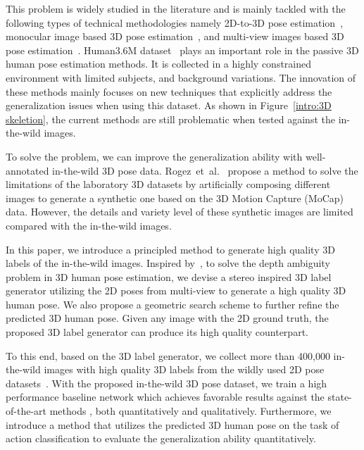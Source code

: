 \documentclass[10pt,twocolumn,letterpaper]{article}
\def\etal{et~al.\xspace}
\begin{document}
This problem is widely studied in the literature and is mainly tackled with the following types of technical methodologies namely 2D-to-3D pose estimation~\cite{fang2017learning, martinez2017simple}, monocular image based 3D pose estimation~\cite{zhou2017towards, yang20183d}, and multi-view images based 3D pose estimation~\cite{rhodin2018learning}. 
Human3.6M dataset~\cite{h36m_pami} plays an important role in the passive 3D human pose estimation methods.
It is collected in a highly constrained environment with limited subjects, and background variations.
The innovation of these methods mainly focuses on new techniques that explicitly address the generalization issues when using this dataset.
As shown in Figure~\ref{intro:3D skeletion}, the current methods are still problematic when tested against the in-the-wild images.


To solve the problem, we can improve the generalization ability with well-annotated in-the-wild 3D pose data.
Rogez~\etal~\cite{rogez2016mocap} propose a method to solve the limitations of the laboratory 3D datasets by artificially composing different images to generate a synthetic one based on the 3D Motion Capture (MoCap) data. 
However, the details and variety level of these synthetic images are limited compared with the in-the-wild images.


In this paper, we introduce a principled method to generate high quality 3D labels of the in-the-wild images.
Inspired by~\cite{rhodin2018learning}, to solve the depth ambiguity problem in 3D human pose estimation, we devise a stereo inspired 3D label generator utilizing the 2D poses from multi-view to generate a high quality 3D human pose.
We also propose a geometric search scheme to further refine the predicted 3D human pose. 
Given any image with the 2D ground truth, the proposed 3D label generator can produce its high quality counterpart.


To this end, based on the 3D label generator, we collect more than 400,000 in-the-wild images with high quality 3D labels from the wildly used 2D pose datasets~\cite{andriluka14cvpr,johnsonclustered,wu2017ai}.
With the proposed in-the-wild 3D pose dataset, we train a high performance baseline network which achieves favorable results against the state-of-the-art methods
, both quantitatively and qualitatively.
Furthermore, we introduce a method that utilizes the predicted 3D human pose on the task of action classification to evaluate the generalization ability quantitatively.
\end{document}
